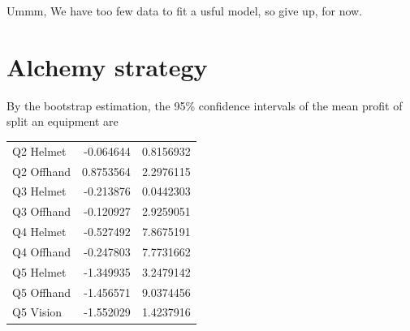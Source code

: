 \documentclass{manuscript}
\begin{document}
    Ummm, We have too few data to fit a usful model, so give up, for now.

    \section{Alchemy strategy}

    By the bootstrap estimation, the 95\% confidence intervals of the mean profit of split an equipment are

    \begin{center}
        \begin{tabular}{ l r r }
            Q2 Helmet  & -0.064644 & 0.8156932 \\
            Q2 Offhand & 0.8753564 & 2.2976115 \\
            Q3 Helmet  & -0.213876 & 0.0442303 \\
            Q3 Offhand & -0.120927 & 2.9259051 \\
            Q4 Helmet  & -0.527492 & 7.8675191 \\
            Q4 Offhand & -0.247803 & 7.7731662 \\
            Q5 Helmet  & -1.349935 & 3.2479142 \\
            Q5 Offhand & -1.456571 & 9.0374456 \\
            Q5 Vision  & -1.552029 & 1.4237916
        \end{tabular}
    \end{center}
\end{document}
